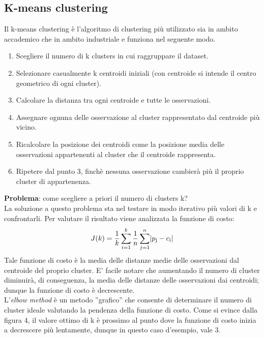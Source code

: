 \documentclass[10pt,a4paper]{report}
\DeclarePairedDelimiter\abs{\lvert}{\rvert}
\begin{document}
        \subsection{K-means clustering}
        		Il k-means clustering è l'algoritmo di clustering più utilizzato sia in ambito accademico che in ambito industriale e funziona nel seguente modo.
        		\begin{enumerate}
        		\item Scegliere il numero di k clusters in cui raggruppare il dataset.
        		\item Selezionare casualmente k centroidi iniziali (con centroide si intende il centro geometrico di ogni cluster).
        		\item Calcolare la distanza tra ogni centroide e tutte le osservazioni.
        		\item Assegnare ognuna delle osservazione al cluster rappresentato dal centroide più vicino.
        		\item Ricalcolare la posizione dei centroidi come la posizione media delle osservazioni appartenenti al cluster che il centroide rappresenta.
        		\item Ripetere dal punto 3, finchè nessuna osservazione cambierà più il proprio cluster di appartenenza.
        		\end{enumerate}
		\textbf{Problema}: come scegliere a priori il numero di clusters k?\\
		La soluzione a questo problema sta nel testare in modo iterativo più valori di k e confrontarli. 
		Per valutare il risultato viene analizzata la funzione di costo:
		\[
		J(k)=\frac{1}{k}
		\sum_{i=1}^k
		\frac{1}{n}
		\sum_{j=1}^n
		\abs{p\textsubscript{j}-c\textsubscript{i}}
		\]
		Tale funzione di costo è la media delle distanze medie delle osservazioni dal centroide del proprio cluster. E' facile notare che aumentando il numero di
		cluster diminuirà, di conseguenza, la media delle distanze delle osservazioni dai centroidi; dunque la funzione di costo è decrescente.\\
		L'\textit{elbow method} è un metodo ''grafico'' che consente di determinare il numero di cluster ideale valutando la pendenza della funzione di costo.
		Come si evince dalla figura 4, il valore ottimo di k è prossimo al punto dove la funzione di costo inizia a decrescere più lentamente, dunque in questo caso d'esempio,
		vale 3.
\end{document}
